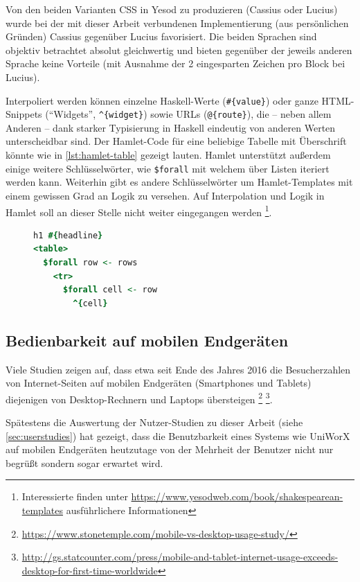 \documentclass[11pt,a4paper,twoside,ngerman]{article}
\begin{document}
Von den beiden Varianten CSS in Yesod zu produzieren (Cassius oder Lucius) wurde bei der mit dieser Arbeit verbundenen Implementierung (aus persönlichen Gründen) Cassius gegenüber Lucius favorisiert. Die beiden Sprachen sind objektiv betrachtet absolut gleichwertig und bieten gegenüber der jeweils anderen Sprache keine Vorteile (mit Ausnahme der 2 eingesparten Zeichen pro Block bei Lucius).

Interpoliert werden können einzelne Haskell-Werte (\lstinline|#{value}|) oder ganze HTML-Snippets ("`Widgets"', \lstinline|^{widget}|) sowie URLs (\lstinline|@{route}|), die -- neben allem Anderen -- dank starker Typisierung in Haskell eindeutig von anderen Werten unterscheidbar sind. Der Hamlet-Code für eine beliebige Tabelle mit Überschrift könnte wie in \autoref{lst:hamlet-table} gezeigt lauten. Hamlet unterstützt außerdem einige weitere Schlüsselwörter, wie \texttt{\$forall} mit welchem über Listen iteriert werden kann. Weiterhin gibt es andere Schlüsselwörter um Hamlet-Templates mit einem gewissen Grad an Logik zu versehen. Auf Interpolation und Logik in Hamlet soll an dieser Stelle nicht weiter eingegangen werden \footnote{Interessierte finden unter \url{https://www.yesodweb.com/book/shakespearean-templates} ausführlichere Informationen}.

\begin{figure}[h]
  \begin{lstlisting}[language=Hamlet, caption={Tabelle mit Interpolation in \emph{Hamlet}}, label={lst:hamlet-table}]
h1 #{headline}
<table>
  $forall row <- rows
    <tr>
      $forall cell <- row
        ^{cell}
  \end{lstlisting}
\end{figure}

\subsection{Bedienbarkeit auf mobilen Endgeräten}
Viele Studien zeigen auf, dass etwa seit Ende des Jahres 2016 die Besucherzahlen von Internet-Seiten auf mobilen Endgeräten (Smartphones und Tablets) diejenigen von Desktop-Rechnern und Laptops übersteigen \footnote{\url{https://www.stonetemple.com/mobile-vs-desktop-usage-study/}} \footnote{\url{http://gs.statcounter.com/press/mobile-and-tablet-internet-usage-exceeds-desktop-for-first-time-worldwide}}.

Spätestens die Auswertung der Nutzer-Studien zu dieser Arbeit (siehe \autoref{sec:userstudies}) hat gezeigt, dass die Benutzbarkeit eines Systems wie UniWorX auf mobilen Endgeräten heutzutage von der Mehrheit der Benutzer nicht nur begrüßt sondern sogar erwartet wird.
\end{document}
